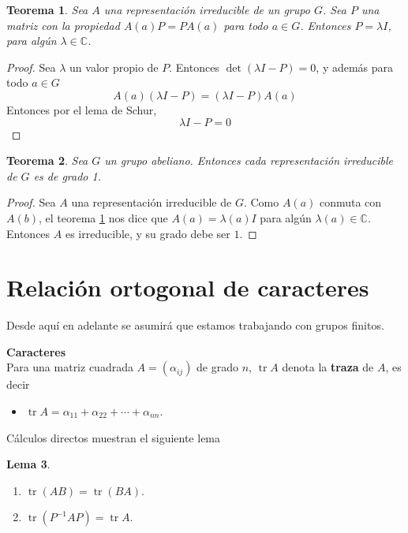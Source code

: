 \documentclass[12pt]{book}
\DeclareMathOperator{\tr}{tr}
\newtheorem{theorem}{Teorema}[section]
\theoremstyle{definition}
\newtheorem{lemma}[theorem]{Lema}
\newcounter{in}
\newcounter{ini}
\begin{document}
\begin{theorem}
  \label{t3_2}
  Sea $A$ una representación irreducible de un grupo $G$. Sea $P$ una
  matriz con la propiedad $A(a)P=PA(a)$ para todo $a \in G$. Entonces
  $P=\lambda I$, para algún $\lambda \in \mathbb{C}$.
\end{theorem}
\begin{proof}
  Sea $\lambda$ un valor propio de $P$. Entonces
  $\det(\lambda I - P)=0$, y además para todo $a \in G$
  \begin{equation}
    \label{eq:20}
    A(a)(\lambda I - P)=(\lambda I - P)A(a)
  \end{equation}
  Entonces por el lema de Schur,
  \begin{equation}
    \label{eq:21}
    \lambda I-P=0
  \end{equation}
\end{proof}

\begin{theorem}
  \label{t3_3}
  Sea $G$ un grupo abeliano. Entonces cada
representación irreducible de $G$ es de grado 1.
\end{theorem}

\begin{proof}
  Sea $A$ una representación irreducible de $G$. Como $A(a)$ conmuta
  con $A(b)$, el teorema \ref{t3_2} nos dice que $A(a)=\lambda(a) I$
  para algún $\lambda(a) \in \mathbb{C}$. Entonces $A$ es irreducible,
  y su grado debe ser $1$.
\end{proof}

\section{Relación ortogonal de caracteres}
\label{sec:roc}
Desde aquí en adelante se asumirá que estamos trabajando con grupos
finitos.

\textbf{Caracteres}\\
Para una matriz cuadrada $A=(\alpha_{ij})$ de grado
$n$, $\tr A$ denota la \textbf{traza} de $A$, es decir
\begin{itemize}
  \item $\tr A= \alpha_{11}+ \alpha_{22} + \cdots + \alpha_{nn}$.
  \end{itemize}

Cálculos directos muestran el siguiente lema

\begin{lemma}
   \label{l4_1}
  \begin{enumerate} Para alguna matriz no singular $P$, se sigue que:
  \item $\tr (AB)=\tr (BA) $.
  \item $\tr (P^{-1}AP)=\tr A$.
  \end{enumerate}
\end{lemma}
\end{document}
